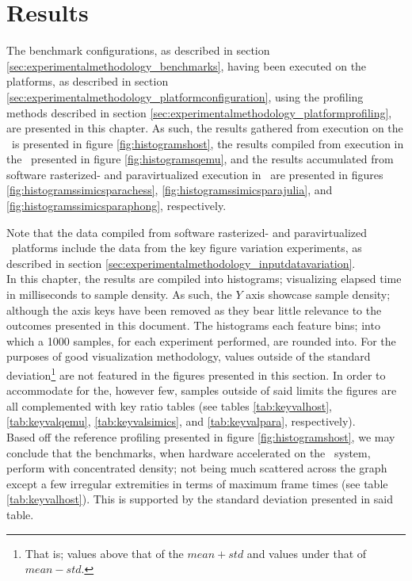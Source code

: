 
\chapter{Results}
\label{cha:results}
The benchmark configurations, as described in section \ref{sec:experimentalmethodology_benchmarks}, having been executed on the platforms, as described in section \ref{sec:experimentalmethodology_platformconfiguration}, using the profiling methods described in section \ref{sec:experimentalmethodology_platformprofiling}, are presented in this chapter.
As such, the results gathered from execution on the \dvttermhost\ is presented in figure \ref{fig:histogramshost}, the results compiled from execution in the \dvttermandroidemulator\ presented in figure \ref{fig:histogramsqemu}, and the results accumulated from software rasterized- and paravirtualized execution in \dvttermsimics\ are presented in figures \ref{fig:histogramssimicsparachess}, \ref{fig:histogramssimicsparajulia}, and \ref{fig:histogramssimicsparaphong}, respectively.

Note that the data compiled from software rasterized- and paravirtualized \dvttermsimics\ platforms include the data from the key figure variation experiments, as described in section \ref{sec:experimentalmethodology_inputdatavariation}.\\

\noindent
In this chapter, the results are compiled into histograms; visualizing elapsed time in milliseconds to sample density.
As such, the $Y$ axis showcase sample density; although the axis keys have been removed as they bear little relevance to the outcomes presented in this document.
The histograms each feature  bins; into which a 1000 samples, for each experiment performed, are rounded into.
For the purposes of good visualization methodology, values outside of the standard deviation\footnote{That is; values above that of the $mean + std$ and values under that of $mean - std$.} are not featured in the figures presented in this section.
In order to accommodate for the, however few, samples outside of said limits the figures are all complemented with key ratio tables (see tables \ref{tab:keyvalhost}, \ref{tab:keyvalqemu}, \ref{tab:keyvalsimics}, and \ref{tab:keyvalpara}, respectively).\\

\noindent
Based off the reference profiling presented in figure \ref{fig:histogramshost}, we may conclude that the benchmarks, when hardware accelerated on the \dvttermhost\ system, perform with concentrated density; not being much scattered across the graph except a few irregular extremities in terms of maximum frame times (see table \ref{tab:keyvalhost}).
This is supported by the standard deviation presented in said table.

